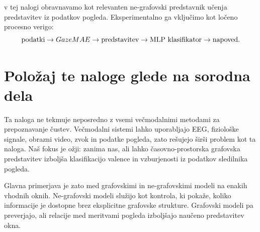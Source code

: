 \GazeMAE{} v tej nalogi obravnavamo kot relevanten ne-grafovski predstavnik učenja predstavitev iz podatkov pogleda.
Eksperimentalno ga vključimo kot ločeno procesno verigo:
\begin{equation}
    \text{podatki}
    \rightarrow
    GazeMAE{}
    \rightarrow
    \text{predstavitev}
    \rightarrow
    \text{MLP klasifikator}
    \rightarrow
    \text{napoved}.
\end{equation}

\section{Položaj te naloge glede na sorodna dela}
\label{subsec:polozaj-naloge}

Ta naloga ne tekmuje neposredno z vsemi večmodalnimi metodami za prepoznavanje čustev.
Večmodalni sistemi lahko uporabljajo EEG, fiziološke signale, obrazni video, zvok in podatke pogleda, zato rešujejo širši problem kot ta naloga.
Naš fokus je ožji: zanima nas, ali lahko časovno-prostorska grafovska predstavitev izboljša klasifikacijo valence in vzburjenosti iz podatkov sledilnika pogleda.

Glavna primerjava je zato med grafovskimi in ne-grafovskimi modeli na enakih vhodnih oknih.
Ne-grafovski modeli služijo kot kontrola, ki pokaže, koliko informacije je dostopne brez eksplicitne grafovske strukture.
Grafovski modeli pa preverjajo, ali relacije med meritvami pogleda izboljšajo naučeno predstavitev okna.
